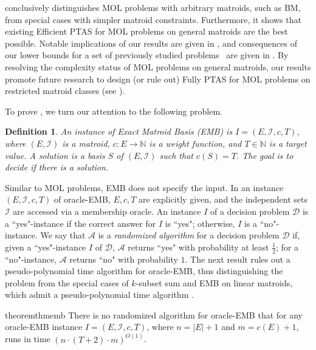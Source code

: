 \documentclass[11pt,letter]{article}
\newcommand{\cA}{{\mathcal{A}}}
\newcommand{\cI}{{\mathcal{I}}}
\newcommand{\cD}{{\mathcal{D}}}
\newtheorem{definition}[lemma]{Definition}
\begin{document}
 conclusively distinguishes MOL problems with arbitrary matroids, such as BM, from special cases with simpler matroid constraints. Furthermore, it shows that existing Efficient PTAS \cite{HL04,DKS23,DKS23b} for MOL problems on general matroids are the best possible. Notable implications of our results are given in , and consequences of our lower bounds for a set of previously studied problems~\cite{ CGM92,HL04,BBGS11,CVZ11,GZ10,CCNR13,DKS23,DKS23b,doron2023budgeted}
are given in . By resolving the complexity status of MOL problems on general matroids, our results promote future research to design (or rule out) Fully PTAS for MOL problems on restricted matroid classes (see ). 

To prove , we turn our attention to the following problem. %
\begin{definition}
	\label{def:EMB}
	An instance of {\sc Exact Matroid Basis (EMB)}  is $I =  (E,\cI,c,T)$, where $(E,\cI)$ is a matroid, $c:E \rightarrow \mathbb{N}$ is a weight function, and $T \in \mathbb{N}$ is a target value. A {\em solution} is a basis $S$ of $(E,\cI)$ such that $c(S)=T$. The goal is to decide if there is a solution. 
\end{definition}
Similar to MOL problems, EMB does not specify the input. 
In an instance $(E,\cI,c,T)$ of {\sc oracle-EMB},
$E,c,T$ are explicitly given, and the independent sets $\cI$ are accessed via a membership oracle. An instance $I$ of a decision problem $\cD$
is a ``yes"-instance if the correct answer for $I$ is ``yes"; otherwise, $I$ is a ``no"-instance.
We say that $\cA$ is a {\em randomized algorithm} for a decision problem $\cD$ if,
 given a ``yes"-instance $I$ of $\cD$, $\cA$ returns ``yes"  with probability at least $\frac{1}{2}$; for a ``no"-instance, $\cA$ returns ``no" with probability $1$. The next result rules out a pseudo-polynomial time algorithm for oracle-EMB, thus distinguishing the problem from the special cases of $k$-{\sc subset sum} and EMB on linear matroids, which admit a pseudo-polynomial  time algorithm \cite{CGM92}. 

\begin{restatable}{theorem}{thmemb}
	\label{thm:emb}
	There is no randomized  algorithm  for {\sc oracle-EMB} that for any  \textnormal{oracle-EMB} instance $I =(E,\cI,c,T)$, where $n = |E|+1$ and  $m = c(E)+1$,  runs in time $ \left(n \cdot(T+2) \cdot m \right)^{O(1)}$. 
\end{restatable}
\end{document}
